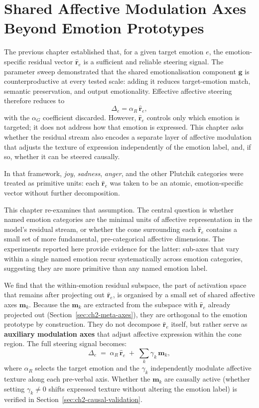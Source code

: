 \chapter{Shared Affective Modulation Axes Beyond Emotion Prototypes}
\label{chap:development2_preverbal_vectors}

The previous chapter established that, for a given target emotion $e$, the emotion-specific residual vector $\hat{\mathbf{r}}_e$ is a sufficient and reliable steering signal. The parameter sweep demonstrated that the shared emotionalisation component $\mathbf{g}$ is counterproductive at every tested scale: adding it reduces target-emotion match, semantic preservation, and output emotionality. Effective affective steering therefore reduces to
\[
\Delta_e = \alpha_R\,\hat{\mathbf{r}}_e,
\]
with the $\alpha_G$ coefficient discarded. However, $\hat{\mathbf{r}}_e$ controls only which emotion is targeted; it does not address how that emotion is expressed. This chapter asks whether the residual stream also encodes a separate layer of affective modulation that adjusts the texture of expression independently of the emotion label, and, if so, whether it can be steered causally.\par

In that framework, \textit{joy}, \textit{sadness}, \textit{anger}, and the other Plutchik categories were treated as primitive units: each $\hat{\mathbf{r}}_e$ was taken to be an atomic, emotion-specific vector without further decomposition.\par

This chapter re-examines that assumption. The central question is whether named emotion categories are the minimal units of affective representation in the model's residual stream, or whether the cone surrounding each $\hat{\mathbf{r}}_e$ contains a small set of more fundamental, pre-categorical affective dimensions. The experiments reported here provide evidence for the latter: sub-axes that vary within a single named emotion recur systematically across emotion categories, suggesting they are more primitive than any named emotion label.\par

We find that the within-emotion residual subspace, the part of activation space that remains after projecting out $\hat{\mathbf{r}}_e$, is organised by a small set of shared affective axes $\mathbf{m}_k$. Because the $\mathbf{m}_k$ are extracted from the subspace with $\hat{\mathbf{r}}_e$ already projected out (Section~\ref{sec:ch2-meta-axes}), they are orthogonal to the emotion prototype by construction. They do not decompose $\hat{\mathbf{r}}_e$ itself, but rather serve as \textbf{auxiliary modulation axes} that adjust affective expression within the cone region. The full steering signal becomes:
\[
\Delta_e \;=\; \alpha_R\,\hat{\mathbf{r}}_e \;+\; \sum_{k}\gamma_k\,\mathbf{m}_k,
\]
where $\alpha_R$ selects the target emotion and the $\gamma_k$ independently modulate affective texture along each pre-verbal axis. Whether the $\mathbf{m}_k$ are causally active (whether setting $\gamma_k \neq 0$ shifts expressed texture without altering the emotion label) is verified in Section~\ref{sec:ch2-causal-validation}.\par


